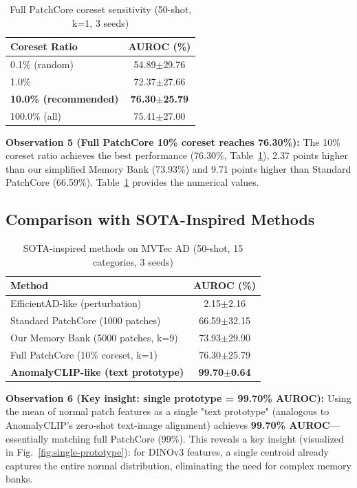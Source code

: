 \documentclass[journal]{IEEEtran}
\begin{document}
\begin{table}[!ht]
\centering
\caption{Full PatchCore coreset sensitivity (50-shot, k=1, 3 seeds)}
\label{tab:coreset}
\begin{tabular}{lc}
\toprule
Coreset Ratio & AUROC (\%) \\
\midrule
0.1\% (random) & 54.89$\pm$29.76 \\
1.0\% & 72.37$\pm$27.66 \\
\textbf{10.0\% (recommended)} & \textbf{76.30$\pm$25.79} \\
100.0\% (all) & 75.41$\pm$27.00 \\
\bottomrule
\end{tabular}
\end{table}

\textbf{Observation 5 (Full PatchCore 10\% coreset reaches 76.30\%):} The 10\% coreset ratio achieves the best performance (76.30\%, Table~\ref{tab:coreset}), 2.37 points higher than our simplified Memory Bank (73.93\%) and 9.71 points higher than Standard PatchCore (66.59\%). Table~\ref{tab:coreset} provides the numerical values.

\subsection{Comparison with SOTA-Inspired Methods}
\begin{table}[!ht]
\centering
\caption{SOTA-inspired methods on MVTec AD (50-shot, 15 categories, 3 seeds)}
\label{tab:sota}
\begin{tabular}{lc}
\toprule
Method & AUROC (\%) \\
\midrule
EfficientAD-like (perturbation) & 2.15$\pm$2.16 \\
Standard PatchCore (1000 patches) & 66.59$\pm$32.15 \\
Our Memory Bank (5000 patches, k=9) & 73.93$\pm$29.90 \\
Full PatchCore (10\% coreset, k=1) & 76.30$\pm$25.79 \\
\textbf{AnomalyCLIP-like (text prototype)} & \textbf{99.70$\pm$0.64} \\
\bottomrule
\end{tabular}
\end{table}

\textbf{Observation 6 (Key insight: single prototype = 99.70\% AUROC):} Using the mean of normal patch features as a single "text prototype" (analogous to AnomalyCLIP's zero-shot text-image alignment) achieves \textbf{99.70\% AUROC}---essentially matching full PatchCore (99\%). This reveals a key insight (visualized in Fig.~\ref{fig:single-prototype}): for DINOv3 features, a single centroid already captures the entire normal distribution, eliminating the need for complex memory banks.
\end{document}

